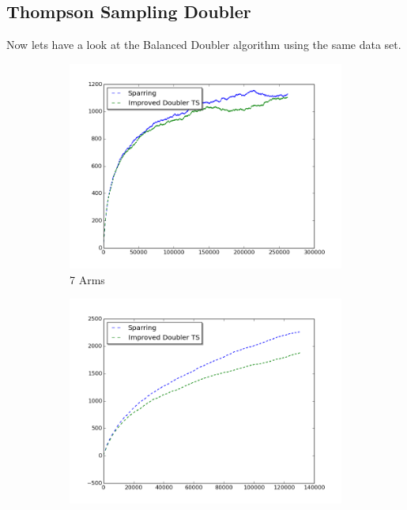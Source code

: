 \documentclass{llncs}
\begin{document}
\subsection{Thompson Sampling Doubler}
Now lets have a look at the Balanced Doubler algorithm using the same data set.
\begin{figure}[h!]
\centering
\begin{subfigure}{.5\textwidth}
  \centering
  \includegraphics[scale=0.3]{figures/improved_doubler_TS_sparring_MQ2007_7arms.png}
  \caption{7 Arms}
  \label{fig:sub1}
\end{subfigure}%
\begin{subfigure}{.5\textwidth}
  \centering
  \includegraphics[scale=0.3]{figures/improved_doubler_TS_sparring_MQ2007_16arms.png}

\end{subfigure}
\end{figure}
\end{document}
